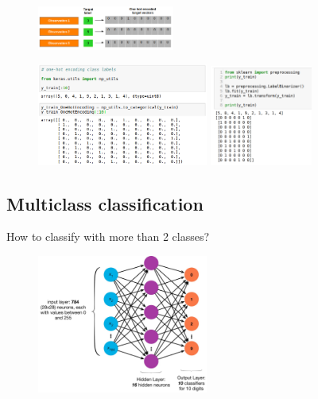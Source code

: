 \documentclass{article}
\begin{document}
\begin{figure}[H]
    \centering
    \includegraphics[width=0.4\textwidth]{one-hot.png}
\end{figure}

\begin{figure}[H]
    \centering
    \includegraphics[width=0.5\textwidth]{one-hot2.png}
    \includegraphics[width=0.3\textwidth]{neural-onehot.png}
    \caption{}
\end{figure}

\subsection{Multiclass classification}


How to classify with more than 2 classes?

\begin{figure}[H]
    \centering
    \includegraphics[width=0.5\textwidth]{multiclass-classification.png}
    \caption{}
\end{figure}
\end{document}

